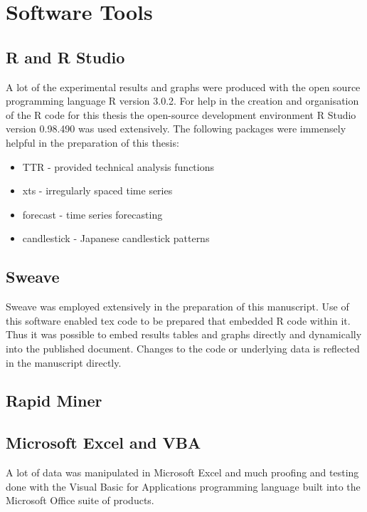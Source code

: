 \section{Software Tools}

\subsection{R and R Studio}
A lot of the experimental results and graphs were produced with the open source programming language R version 3.0.2. For help in the creation and organisation of the R code for this thesis the open-source development environment R Studio version 0.98.490 was used extensively. The following packages were immensely helpful in the preparation of this thesis:
\begin{itemize}
\item TTR - provided technical analysis functions
\item xts - irregularly spaced time series
\item forecast - time series forecasting
\item candlestick - Japanese candlestick patterns
\end{itemize}

\subsection{Sweave}
Sweave \citep{lmucs-papers:Leisch:2002} was employed extensively in the preparation of this manuscript. Use of this software enabled tex code to be prepared that embedded R code within it. Thus it was possible to embed results tables and graphs directly and dynamically into the published document. Changes to the code or underlying data is reflected in the manuscript directly.

\subsection{Rapid Miner}

\subsection{Microsoft Excel and VBA}
A lot of data was manipulated in Microsoft Excel and much proofing and testing done with the Visual Basic for Applications programming language built into the Microsoft Office suite of products.